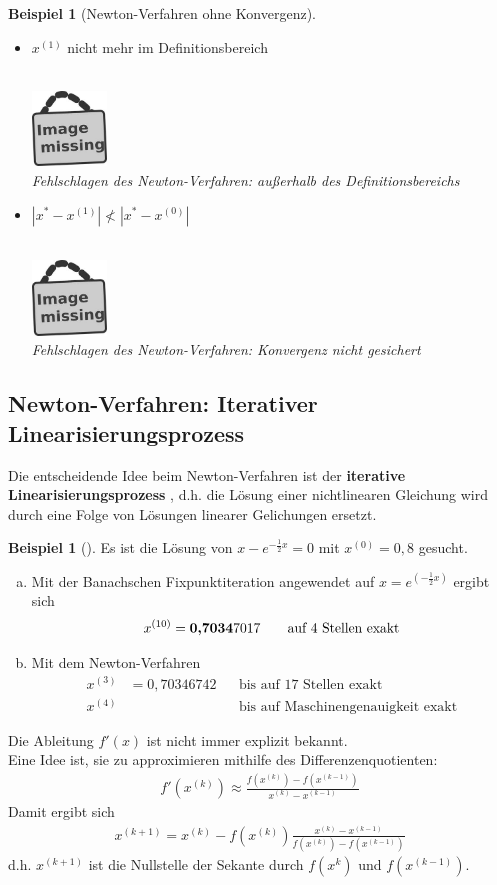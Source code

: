 \documentclass[ngerman,fontsize=11pt, paper=a4, parskip=half, titlepage=true, toc=bib]{scrbook}
\theoremstyle{definition}
\newtheorem{Bsp}[Def]{Beispiel}
\theoremstyle{plain}
\newcommand{\subsectione}[1]{\addtocounter{Def}{1}\subsection{#1}}
\newenvironment{Bspe}[1][]{ %
  \begin{Bsp}[#1]
  }
  {
  \end{Bsp}
  \addtocounter{subsection}{1}
}
\newcommand{\imagemissing}[1]{
  \begin{center}~\\
    \centering 
    \includegraphics[width=2cm]{images/image_missing.jpg}\\
    \textit{#1} \\
  \end{center}
}
\begin{document}

\begin{Bspe}[Newton-Verfahren ohne Konvergenz]~
  \begin{itemize}
  \item $x^{(1)}$ nicht mehr im Definitionsbereich
    \imagemissing{Fehlschlagen des Newton-Verfahren: außerhalb des Definitionsbereichs}
  \item $|x^{*}-x^{(1)}| \nless |x^{*}-x^{(0)}| $
    \imagemissing{Fehlschlagen des Newton-Verfahren: Konvergenz nicht gesichert}
  \end{itemize}
\end{Bspe}

\subsectione{Newton-Verfahren: Iterativer Linearisierungsprozess}
Die entscheidende Idee beim Newton-Verfahren ist der \textbf{iterative Linearisierungsprozess}
, d.h. die Lösung einer nichtlinearen Gleichung wird
durch eine Folge von Lösungen linearer Gelichungen ersetzt.

\begin{Bspe}
  \label{5.4.6}
  Es ist die Lösung von $x-e^{-\frac{1}{2}x}=0$ mit $x^{(0)}=0,8$ gesucht.
  \begin{enumerate}[a)]
  \item Mit der Banachschen Fixpunktiteration angewendet auf 
    $x=e^{(-\frac{1}{2}x)}$ ergibt sich
    \begin{gather*}
      x^{(10)}=\text{\textbf{0,7034}}7017 
      \qquad \text{auf 4 Stellen exakt}
    \end{gather*}
  \item Mit dem Newton-Verfahren
    \begin{align*}
      x^{(3)}&= 0,70346742 &&\text{bis auf 17 Stellen exakt}\\
      x^{(4)} &&& \text{bis auf Maschinengenauigkeit exakt}
    \end{align*}		
  \end{enumerate}
\end{Bspe}
Die Ableitung $f'(x)$ ist nicht immer explizit bekannt. \\
Eine Idee ist, sie zu approximieren mithilfe des Differenzenquotienten:
\begin{gather*}
  f'(x^{(k)})  \approx \frac{f(x^{(k)})-f(x^{(k-1)})}{x^{(k)}-x^{(k-1)}}
\end{gather*}
Damit ergibt sich
\begin{gather*}
  x^{(k+1)} = x^{(k)}-f(x^{(k)}) \frac{x^{(k)} - x^{(k-1)}}{f(x^{(k)})-f(x^{(k-1)})}
\end{gather*}
d.h. $x^{(k+1)} $ ist die Nullstelle der Sekante durch $f(x^{k})$ und $f(x^{(k-1)})$.
\end{document}
